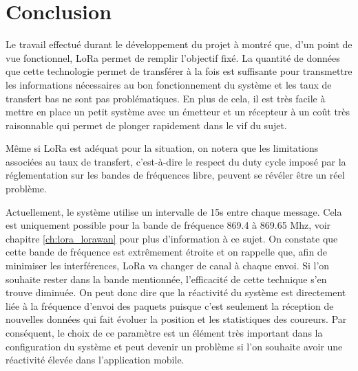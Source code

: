 
\chapter{Conclusion}

Le travail effectué durant le développement du projet à montré que, d'un point de vue fonctionnel, LoRa permet de remplir l'objectif fixé. La quantité de données que cette technologie permet de transférer à la fois est suffisante pour transmettre les informations nécessaires au bon fonctionnement du système et les taux de transfert bas ne sont pas problématiques. En plus de cela, il est très facile à mettre en place un petit système avec un émetteur et un récepteur à un coût très raisonnable qui permet de plonger rapidement dans le vif du sujet.

Même si LoRa est adéquat pour la situation, on notera que les limitations associées au taux de transfert, c'est-à-dire le respect du duty cycle imposé par la réglementation sur les bandes de fréquences libre, peuvent se révéler être un réel problème. 

Actuellement, le système utilise un intervalle de 15s entre chaque message. Cela est uniquement possible pour la bande de fréquence 869.4 à 869.65 Mhz, voir chapitre  \ref{ch:lora_lorawan} pour plus d'information à ce sujet. On constate que cette bande de fréquence est extrêmement étroite et on rappelle que, afin de minimiser les interférences, LoRa va changer de canal à chaque envoi. Si l'on souhaite rester dans la bande mentionnée, l’efficacité de cette technique s’en trouve diminuée. On peut donc dire que la réactivité du système est directement liée à la fréquence d'envoi des paquets puisque c'est seulement la réception de nouvelles données qui fait évoluer la position et les statistiques des coureurs. Par conséquent, le choix de ce paramètre est un élément très important dans la configuration du système et peut devenir un problème si l'on souhaite avoir une réactivité élevée dans l'application mobile.

